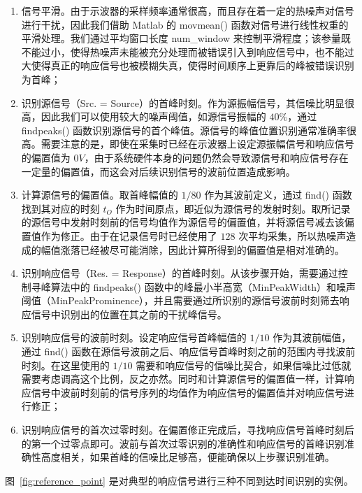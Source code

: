 \begin{enumerate}
  \item 信号平滑。由于示波器的采样频率通常很高，而且存在着一定的热噪声对信号进行干扰，因此我们借助 Matlab 的 movmean() 函数对信号进行线性权重的平滑处理。我们通过平均窗口长度 num\_window 来控制平滑程度；该参量既不能过小，使得热噪声未能被充分处理而被错误引入到响应信号中，也不能过大使得真正的响应信号也被模糊失真，使得时间顺序上更靠后的峰被错误识别为首峰；
  \item 识别源信号（Src. = Source）的首峰时刻。作为源振幅信号，其信噪比明显很高，因此我们可以使用较大的噪声阈值，如源信号振幅的 $40\%$，通过 findpeaks() 函数识别源信号的首个峰值。源信号的峰值位置识别通常准确率很高。需要注意的是，即使在采集时已经在示波器上设定源振幅信号和响应信号的偏置值为 $0\unit{V}$，由于系统硬件本身的问题仍然会导致源信号和响应信号存在一定量的偏置值，而这会对后续识别信号的波前位置造成影响。
  \item 计算源信号的偏置值。取首峰幅值的 $1/80$ 作为其波前定义，通过 find() 函数找到其对应的时刻 $t_{O}$ 作为时间原点，即近似为源信号的发射时刻。取所记录的源信号中发射时刻前的信号均值作为源信号的偏置值，并将源信号减去该偏置值作为修正。由于在记录信号时已经使用了 $128$ 次平均采集，所以热噪声造成的幅值涨落已经被尽可能消除，因此计算所得到的偏置值是相对准确的。
  \item 识别响应信号（Res. = Response）的首峰时刻。从该步骤开始，需要通过控制寻峰算法中的 findpeaks() 函数中的峰最小半高宽（MinPeakWidth）和噪声阈值（MinPeakProminence），并且需要通过所识别的源信号波前时刻筛去响应信号中识别出的位置在其之前的干扰峰信号。
  \item 识别响应信号的波前时刻。设定响应信号首峰幅值的 $1/10$ 作为其波前幅值，通过 find() 函数在源信号波前之后、响应信号首峰时刻之前的范围内寻找波前时刻。在这里使用的 $1/10$ 需要和响应信号的信噪比契合，如果信噪比过低就需要考虑调高这个比例，反之亦然。同时和计算源信号的偏置值一样，计算响应信号中波前时刻前的信号序列的均值作为响应信号的偏置值并对响应信号进行修正；
  \item 识别响应信号的首次过零时刻。在偏置修正完成后，寻找响应信号首峰时刻后的第一个过零点即可。波前与首次过零识别的准确性和响应信号的首峰识别准确性高度相关，如果首峰的信噪比足够高，便能确保以上步骤识别准确。
\end{enumerate}

图~\ref{fig:reference_point} 是对典型的响应信号进行三种不同到达时间识别的实例。

